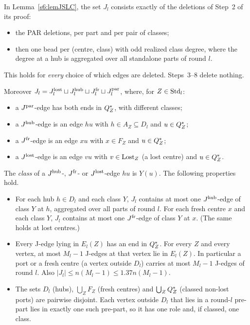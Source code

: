 \begin{lemma}\label{s6:lemJplus}
In Lemma~\ref{s6:lemJSLC}, the set $J_l$ consists exactly of the deletions of Step~2 of its proof:
\begin{itemize}
\item the PAR deletions, per part and per pair of classes;
\item then one bead per (centre, class) with odd realized class degree, where the degree at a hub is aggregated over all standalone parts of round $l$.
\end{itemize}
This holds for \emph{every} choice of which edges are deleted. Steps~3--8 delete nothing.

Moreover $J_l=J^{\mathrm{lost}}_l\sqcup J^{\mathrm{hub}}_l\sqcup J^{\mathrm{fr}}_l\sqcup J^{\mathrm{par}}_l$, where, for $Z\in\mathrm{Std}_l$:
\begin{itemize}
\item a $J^{\mathrm{par}}$-edge has both ends in $Q^{*}_Z$, with different classes;
\item a $J^{\mathrm{hub}}$-edge is an edge $hu$ with $h\in A_Z\subseteq D_l$ and $u\in Q^{*}_Z$;
\item a $J^{\mathrm{fr}}$-edge is an edge $xu$ with $x\in F_Z$ and $u\in Q^{*}_Z$;
\item a $J^{\mathrm{lost}}$-edge is an edge $vu$ with $v\in\mathrm{Lost}_Z$ (a lost centre) and $u\in Q^{*}_Z$.
\end{itemize}
The \emph{class} of a $J^{\mathrm{hub}}$-, $J^{\mathrm{fr}}$- or $J^{\mathrm{lost}}$-edge $hu$ is $Y(u)$. The following properties hold.
\begin{itemize}
\item[\Jp{1}] For each hub $h\in D_l$ and each class $Y$, $J_l$ contains at most one $J^{\mathrm{hub}}$-edge of class $Y$ at $h$, aggregated over all parts of round $l$. For each fresh centre $x$ and each class $Y$, $J_l$ contains at most one $J^{\mathrm{fr}}$-edge of class $Y$ at $x$. (The same holds at lost centres.)
\item[\Jp{2}] Every J-edge lying in $E_l(Z)$ has an end in $Q^{*}_Z$. For every $Z$ and every vertex, at most $M_l-1$ J-edges at that vertex lie in $E_l(Z)$. In particular a port or a fresh centre (a vertex outside $D_l$) carries at most $M_l-1$ J-edges of round $l$. Also $|J_l|\le n(M_l-1)\le1.37n(M_l-1)$.
\item[\Jp{3}] The sets $D_l$ (hubs), $\bigcup_ZF_Z$ (fresh centres) and $\bigcup_ZQ^{*}_Z$ (classed non-lost ports) are pairwise disjoint. Each vertex outside $D_l$ that lies in a round-$l$ pre-part lies in exactly one such pre-part, so it has one role and, if classed, one class.

\end{itemize}
\end{lemma}
